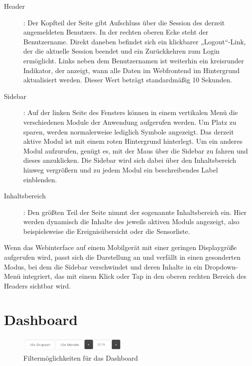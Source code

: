 \documentclass[12pt]{article}
\begin{document}
\begin{description}
				\item[Header]: Der Kopfteil der Seite gibt Aufschluss über die Session des derzeit angemeldeten Benutzers. In der rechten oberen Ecke steht der Benutzername. Direkt daneben befindet sich ein klickbarer „Logout“-Link, der die aktuelle Session beendet und ein Zurückkehren zum Login ermöglicht. Links neben dem Benutzernamen ist weiterhin ein kreisrunder Indikator, der anzeigt, wann alle Daten im Webfrontend im Hintergrund aktualisiert werden. Dieser Wert beträgt standardmäßig 10 Sekunden.
				\item[Sidebar]: Auf der linken Seite des Fensters können in einem vertikalen Menü die verschiedenen Module der Anwendung aufgerufen werden. Um Platz zu sparen, werden normalerweise lediglich Symbole angezeigt. Das derzeit aktive Modul ist mit einem roten Hintergrund hinterlegt. Um ein anderes Modul aufzurufen, genügt es, mit der Maus über die Sidebar zu fahren und dieses anzuklicken. Die Sidebar wird sich dabei über den Inhaltsbereich hinweg vergrößern und zu jedem Modul ein beschreibendes Label einblenden.
				\item[Inhaltsbereich]: Den größten Teil der Seite nimmt der sogenannte Inhaltsbereich ein. Hier werden dynamisch die Inhalte des jeweils aktiven Moduls angezeigt, also beispielsweise die Ereignisübersicht oder die Sensorliste.
\end{description}

Wenn das Webinterface auf einem Mobilgerät mit einer geringen Displaygröße aufgerufen wird, passt sich die Darstellung an und verfällt in einen gesonderten Modus, bei dem die Sidebar verschwindet und deren Inhalte in ein Dropdown-Menü integriert, das mit einem Klick oder Tap in den oberen rechten Bereich des Headers sichtbar wird.

\section{Dashboard}
\begin{figure}
				\vspace{-5pt}
				\centering
				\includegraphics[width=0.48\textwidth]{./graphics/dashboard-filter.png}
				\vspace{-5pt}
				\caption{Filtermöglichkeiten für das Dashboard}
				\label{fig:dashboard-filter}
\end{figure}
\end{document}
